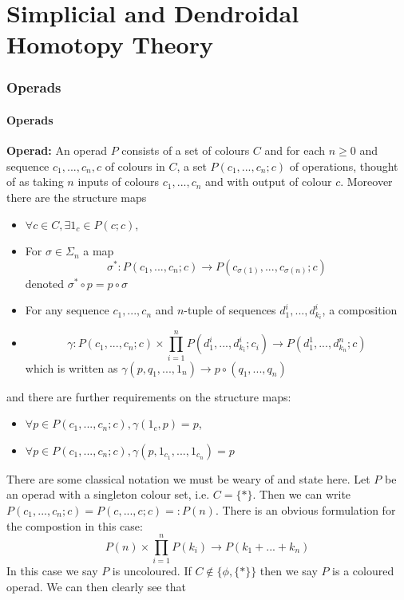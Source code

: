 \part{Simplicial and Dendroidal Homotopy Theory}

\section{Operads}
\subsection{Operads}
\begin{definition}
    \textbf{Operad: }An operad $P$ consists of a set of colours $C$ and for each $n \geq0$ and sequence $c_1,...,c_n, c$ of colours in $C$, a set $P(c_1,...,c_n;c)$ of operations, thought of as taking $n$ inputs of colours $c_1,...,c_n$ and with output of colour $c$. Moreover there are the structure maps

    \begin{itemize}
        \item $\forall c\in C, \exists 1_c \in P(c;c)$,
        \item For $\sigma \in \Sigma_n$ a map \[\sigma^*: P(c_1,...,c_n;c) \to P(c_{\sigma(1)},...,c_{\sigma(n)};c)\] denoted $\sigma^*\circ p = p \circ \sigma$
        \item For any sequence $c_1,...,c_n$ and $n$-tuple of sequences $d^i_1,...,d^i_{k_i}$, a composition
        \item \[\gamma: P(c_1,...,c_n;c)\times \prod_{i = 1}^n P(d^i_1,...,d^i_{k_i};c_i)\to P(d^1_1,...,d^n_{k_n}; c)\] which is written as $\gamma(p,q_1,...,1_n)\to p \circ(q_1,...,q_n)$
    \end{itemize}

    and there are further requirements on the structure maps:
    \begin{itemize}
        \item $\forall p \in P(c_1,...,c_n; c), \gamma(1_c, p) = p$,
        \item $\forall p \in P(c_1,...,c_n;c), \gamma(p, 1_{c_1},...,1_{c_n}) = p$
    \end{itemize}
\end{definition}

There are some classical notation we must be weary of and state here. Let $P$ be an operad with a singleton colour set, i.e. $C = \{*\}$. Then we can write $P(c_1,...,c_n;c) = P(c,...,c;c) =: P(n)$. There is an obvious formulation for the compostion in this case:
\[P(n)\times \prod_{i = 1}^n P(k_i) \to P(k_1 + ... + k_n)\]
In this case we say $P$ is uncoloured. If $C \notin \{\phi, \{*\}\}$ then we say $P$ is a coloured operad. We can then clearly see that

